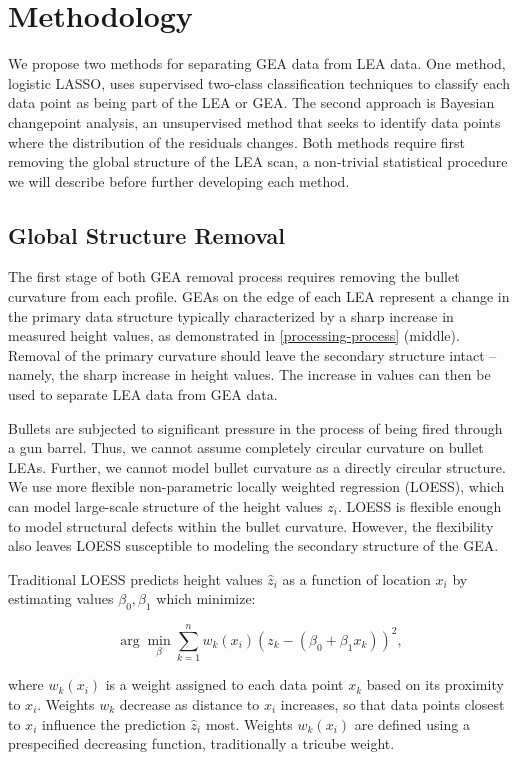 \documentclass[12pt]{article}
\begin{document}
\section{Methodology}

We propose two methods for separating GEA data from LEA data. One
method, logistic LASSO, uses supervised two-class classification
techniques to classify each data point as being part of the LEA or GEA.
The second approach is Bayesian changepoint analysis, an unsupervised
method that seeks to identify data points where the distribution of the
residuals changes. Both methods require first removing the global
structure of the LEA scan, a non-trivial statistical procedure we will
describe before further developing each method.

\subsection{Global Structure Removal}

The first stage of both GEA removal process requires removing the bullet
curvature from each profile. GEAs on the edge of each LEA represent a
change in the primary data structure typically characterized by a sharp
increase in measured height values, as demonstrated in
\autoref{processing-process} (middle). Removal of the primary curvature
should leave the secondary structure intact -- namely, the sharp
increase in height values. The increase in values can then be used to
separate LEA data from GEA data.

Bullets are subjected to significant pressure in the process of being
fired through a gun barrel. Thus, we cannot assume completely circular
curvature on bullet LEAs. Further, we cannot model bullet curvature as a
directly circular structure. We use more flexible non-parametric locally
weighted regression (LOESS), which can model large-scale structure of
the height values \(z_i\). LOESS is flexible enough to model structural
defects within the bullet curvature. However, the flexibility also
leaves LOESS susceptible to modeling the secondary structure of the GEA.

Traditional LOESS predicts height values \(\widehat{z}_i\) as a function
of location \(x_i\) by estimating values \(\beta_0, \beta_1\) which
minimize:

\[ \arg\min_{\beta} \sum_{k=1}^n w_k(x_i) (z_k - (\beta_0 + \beta_1x_k))^2,\]

where \(w_k(x_i)\) is a weight assigned to each data point \(x_k\) based
on its proximity to \(x_i\). Weights \(w_k\) decrease as distance to
\(x_i\) increases, so that data points closest to \(x_i\) influence the
prediction \(\widehat{z}_i\) most. Weights \(w_k(x_i)\) are defined
using a prespecified decreasing function, traditionally a tricube
weight.
\end{document}

